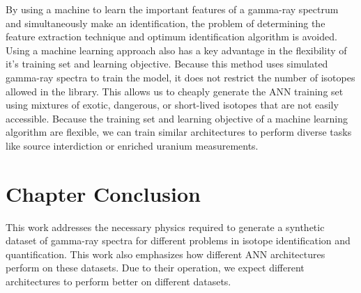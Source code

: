 
By using a machine to learn the important features of a gamma-ray spectrum and simultaneously make an identification, the problem of determining the feature extraction technique and optimum identification algorithm is avoided. Using a machine learning approach also has a key advantage in the flexibility of it's training set and learning objective. Because this method uses simulated gamma-ray spectra to train the model, it does not restrict the number of isotopes allowed in the library. This allows us to cheaply generate the ANN training set using mixtures of exotic, dangerous, or short-lived isotopes that are not easily accessible. Because the training set and learning objective of a machine learning algorithm are flexible, we can train similar architectures to perform diverse tasks like source interdiction or enriched uranium measurements.


\section{Chapter Conclusion}

This work addresses the necessary physics required to generate a synthetic dataset of gamma-ray spectra for different problems in isotope identification and quantification. This work also emphasizes how different ANN architectures perform on these datasets. Due to their operation, we expect different architectures to perform better on different datasets. %

